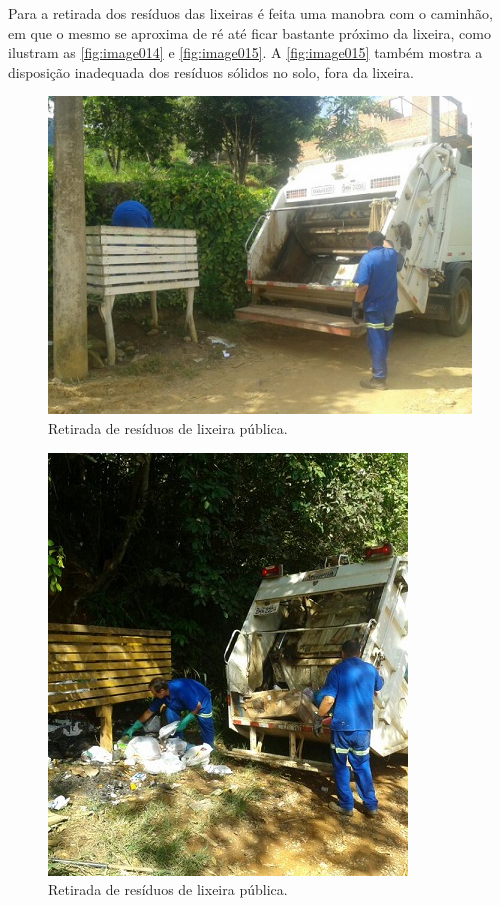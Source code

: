 	Para a retirada dos resíduos das lixeiras é feita uma manobra com o caminhão, em que o mesmo se aproxima de ré até ficar bastante próximo da lixeira, como ilustram as \autoref{fig:image014} e \autoref{fig:image015}. A \autoref{fig:image015} também mostra a disposição inadequada dos resíduos sólidos no solo, fora da lixeira.
	
	\begin{figure}
		\centering
		\includegraphics[width=0.75\linewidth]{produtos/prodtres/image014}
		\caption{Retirada de resíduos de lixeira pública.}
		\label{fig:image014}
	\end{figure}
	
	\begin{figure}
		\centering
		\includegraphics[width=0.75\linewidth]{produtos/prodtres/image015}
		\caption{Retirada de resíduos de lixeira pública.}
		\label{fig:image015}
	\end{figure}
	
